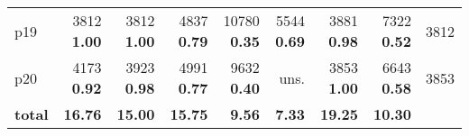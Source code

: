 \begin{tabular}{|l|rrrrrrr|r|}
p19 & {\footnotesize 3812} \textbf{1.00} & {\footnotesize 3812} \textbf{1.00} & {\footnotesize 4837} \textbf{0.79} & {\footnotesize 10780} \textbf{0.35} & {\footnotesize 5544} \textbf{0.69} & {\footnotesize 3881} \textbf{0.98} & {\footnotesize 7322} \textbf{0.52} & 3812\\
p20 & {\footnotesize 4173} \textbf{0.92} & {\footnotesize 3923} \textbf{0.98} & {\footnotesize 4991} \textbf{0.77} & {\footnotesize 9632} \textbf{0.40} & uns. & {\footnotesize 3853} \textbf{1.00} & {\footnotesize 6643} \textbf{0.58} & 3853\\
\hline
\textbf{total} & \textbf{16.76} & \textbf{15.00} & \textbf{15.75} & \textbf{9.56} & \textbf{7.33} & \textbf{19.25} & \textbf{10.30} & \\
\hline
\end{tabular}


